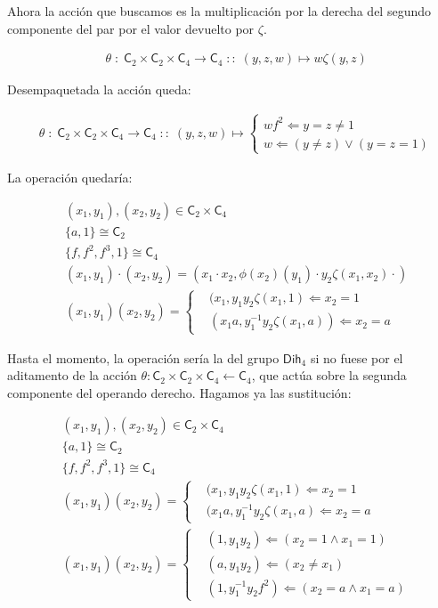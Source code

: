 \documentclass[12pt,a4paper,fleqn,spanish,final,openright]{extbook}
\theoremstyle{definition}
\theoremstyle{remark}
\begin{document}
	Ahora la acción que buscamos es la multiplicación por la derecha del segundo componente del par por el valor devuelto por $\zeta$.

\begin{align*}
&\theta \;:\; 
{{{\mathsf{C}}_{2}}{\times}{{\mathsf{C}}_{2}}{\times}{{\mathsf{C}}_{4}}}
\longrightarrow
{{\mathsf{C}}_{4}}\;::\;\left(y,z,w\right) \mapsto w\zeta\left(y,z\right)
\end{align*}


	Desempaquetada la acción queda:


\begin{align*}
&\theta \;:\; 
{{{\mathsf{C}}_{2}}{\times}{{\mathsf{C}}_{2}}{\times}{{\mathsf{C}}_{4}}}
\longrightarrow
{{\mathsf{C}}_{4}}\;::\;\left(y,z,w\right) \mapsto
\begin{cases}
wf^2 \Leftarrow {y=z\neq 1}\\
w \Leftarrow (y\neq z)\vee(y=z=1)
\end{cases}
\end{align*}


	La operación quedaría:
	
\begin{align*}
&(x_1,y_1),(x_2,y_2)\in \mathsf{C}_{2}\times\mathsf{C}_{4}\\
&\{a,1\}\cong\mathsf{C}_{2}\\
&\{f,f^2,f^3,1\}\cong\mathsf{C}_{4}\\
&(x_1,y_1)⋅(x_2,y_2)=(x_1⋅x_2, \phi(x_2)(y_1)⋅y_2 \zeta(x_1,x_2)⋅)\\
&(x_1,y_1) (x_2,y_2)=
\begin{cases}
&(x_1,y_1 y_2\zeta(x_1,1) \Leftarrow x_2 = 1\\
&(x_1 a,y_1^{-1} y_2\zeta(x_1,a)) \Leftarrow x_2 = a
\end{cases}
\end{align*}

	Hasta el momento, la operación sería la del grupo $\mathsf{Dih}_{4}$ si no fuese por el aditamento de la acción 
$\theta : \mathsf{C}_{2} \times \mathsf{C}_{2}\times \mathsf{C}_{4} \longleftarrow \mathsf{C}_{4}$, que actúa sobre 
la segunda componente del operando derecho. Hagamos ya las sustitución:
	
\begin{align*}
&(x_1,y_1),(x_2,y_2)\in \mathsf{C}_{2}\times\mathsf{C}_{4}\\
&\{a,1\}\cong\mathsf{C}_{2}\\
&\{f,f^2,f^3,1\}\cong\mathsf{C}_{4}\\
&(x_1,y_1) (x_2,y_2)=
\begin{cases}
&(x_1,y_1 y_2 \zeta(x_1,1) \Leftarrow x_2 = 1\\
&(x_1 a,y_1^{-1} y_2 \zeta(x_1,a) \Leftarrow x_2 = a
\end{cases}
\\
&(x_1,y_1) (x_2,y_2)=
\begin{cases}
&(1,y_1 y_2) \Leftarrow \left(x_2 = 1 \wedge x_1 = 1\right)\\
&(a,y_1 y_2) \Leftarrow \left(x_2 \neq x_1 \right)\\
&(1,y_1^{-1} y_2 f^2) \Leftarrow \left(x_2 = a \wedge x_1 = a\right)
\end{cases}
\end{align*}
\end{document}
